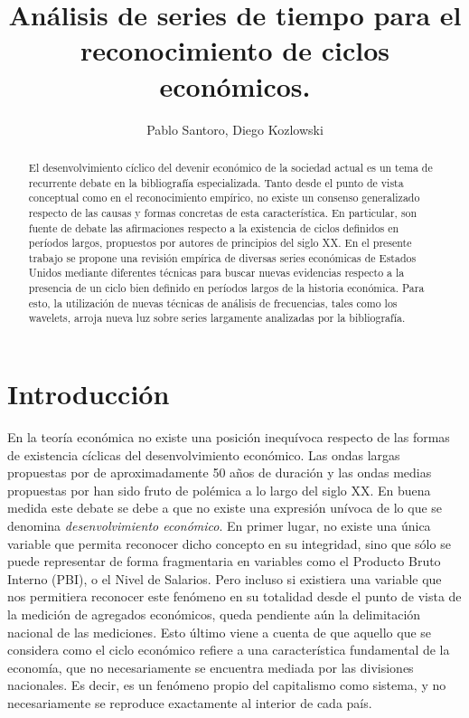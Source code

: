 \documentclass[a4paper]{article}
\title{Análisis de series de tiempo para el reconocimiento de ciclos económicos.}
\author{Pablo Santoro, Diego Kozlowski}
\begin{document}
\maketitle

\begin{abstract}
	
	El desenvolvimiento cíclico del devenir económico de la sociedad actual es un tema de recurrente debate en la bibliografía especializada. Tanto desde el punto de vista conceptual como en el reconocimiento empírico, no existe un consenso generalizado respecto de las causas y formas concretas de esta característica. En particular, son fuente de debate las afirmaciones respecto a la existencia de ciclos definidos en períodos largos, propuestos por autores de principios del siglo XX. En el presente trabajo se propone una revisión empírica de diversas series económicas de Estados Unidos mediante diferentes técnicas para buscar nuevas evidencias respecto a la presencia de un ciclo bien definido en períodos largos de la historia económica. Para esto, la utilización de nuevas técnicas de análisis de frecuencias, tales como los wavelets, arroja nueva luz sobre series largamente analizadas por la bibliografía.
\end{abstract}

\section{Introducción}

En la teoría económica no existe una posición inequívoca respecto de las formas de existencia cíclicas del desenvolvimiento económico. Las ondas largas propuestas por \cite{kondratieff1979long} de aproximadamente 50 años de duración y las ondas medias propuestas por \cite{kuznets1930secular} han sido fruto de polémica a lo largo del siglo XX. En buena medida este debate se debe a que no existe una expresión unívoca de lo que se denomina \textit{desenvolvimiento económico}. En primer lugar, no existe una única variable que permita reconocer dicho concepto en su integridad, sino que sólo se puede representar de forma fragmentaria en variables como el Producto Bruto Interno (PBI), o el Nivel de Salarios. Pero incluso si existiera una variable que nos permitiera reconocer este fenómeno en su totalidad desde el punto de vista de la medición de agregados económicos, queda pendiente aún la delimitación nacional de las mediciones. Esto último viene a cuenta de que aquello que se considera como el ciclo económico refiere a una característica fundamental de la economía, que no necesariamente se encuentra mediada por las divisiones nacionales. Es decir, es un fenómeno propio del capitalismo como sistema, y no necesariamente se reproduce exactamente al interior de cada país. 
\end{document}
